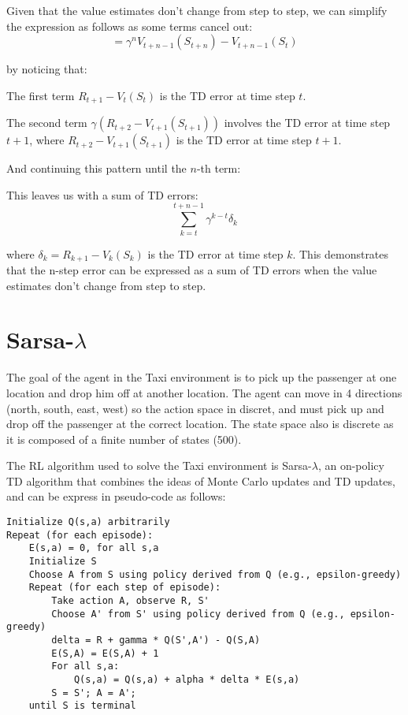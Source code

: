 \documentclass{article}
\begin{document}
Given that the value estimates don't change from step to step, we can simplify the expression as follows as some terms cancel out:
\[ = \gamma^n V_{t+n-1}(S_{t+n}) - V_{t+n-1}(S_t) \]

by noticing that:

The first term \(R_{t+1} - V_{t}(S_t)\) is the TD error at time step \(t\).

The second term \(\gamma(R_{t+2} - V_{t+1}(S_{t+1}))\)
 involves the TD error at time step \(t+1\),
  where \(R_{t+2} - V_{t+1}(S_{t+1})\) is the TD error at time step \(t+1\).

And continuing this pattern until the \(n\)-th term:

This leaves us with a sum of TD errors:
\[ \sum_{k=t}^{t+n-1} \gamma^{k-t} \delta_k \]

where \( \delta_k = R_{k+1} - V_k(S_k) \) is the TD error at time step \(k\). This demonstrates that the n-step error can be expressed as a sum of TD errors when the value estimates don't change from step to step.


\section{Sarsa-$\lambda$}


The goal of the agent in the Taxi environment is to pick up the passenger at one location and drop him off at another location.
The agent can move in 4 directions (north, south, east, west) so the action space in discret,
and must pick up and drop off the passenger at the correct location.
The state space also is discrete 
as it is composed of a finite number of states (500).

The RL algorithm used to solve the Taxi environment is Sarsa-$\lambda$,
an on-policy TD algorithm that combines the ideas of Monte Carlo updates and TD updates,
and can be express in pseudo-code as follows:

\begin{verbatim}
Initialize Q(s,a) arbitrarily
Repeat (for each episode):
    E(s,a) = 0, for all s,a
    Initialize S
    Choose A from S using policy derived from Q (e.g., epsilon-greedy)
    Repeat (for each step of episode):
        Take action A, observe R, S'
        Choose A' from S' using policy derived from Q (e.g., epsilon-greedy)
        delta = R + gamma * Q(S',A') - Q(S,A)
        E(S,A) = E(S,A) + 1
        For all s,a:
            Q(s,a) = Q(s,a) + alpha * delta * E(s,a)
        S = S'; A = A';
    until S is terminal
\end{verbatim}
\end{document}
